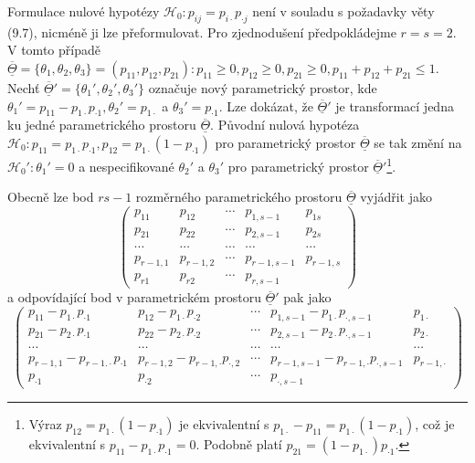 Formulace nulové hypotézy $\mathscr{H}_0: p_{ij} = p_{i \cdot}p_{\cdot j}$ není v souladu s požadavky věty (9.7), nicméně ji lze přeformulovat. Pro zjednodušení předpokládejme $r = s = 2$. V tomto případě $\overline{\underline{\Theta}} = \{\theta_1, \theta_2, \theta_3\} = (p_{11}, p_{12}, p_{21}): p_{11} \ge 0, p_{12} \ge 0, p_{21} \ge 0, p_{11} + p_{12} + p_{21} \le 1$. Nechť $\overline{\underline{\Theta}}' = \{\theta_1', \theta_2', \theta_3'\}$ označuje nový parametrický prostor, kde $\theta_1' = p_{11} - p_{1 \cdot}p_{\cdot 1}, \theta_2' = p_{1 \cdot}$ a $\theta_3' = p_{\cdot 1}$. Lze dokázat, že $\overline{\underline{\Theta}}'$ je transformací jedna ku jedné parametrického prostoru  $\overline{\underline{\Theta}}$. Původní nulová hypotéza $\mathscr{H}_0: p_{11} = p_{1 \cdot}p_{\cdot 1}, p_{12} = p_{1 \cdot}(1 - p_{\cdot 1})$ pro parametrický prostor $\overline{\underline{\Theta}}$ se tak změní na $\mathscr{H}_0': \theta_1' = 0$ a nespecifikované $\theta_2'$ a $\theta_3'$ pro parametrický prostor $\overline{\underline{\Theta}}'$\footnote{Výraz $p_{12} = p_{1 \cdot}(1 - p_{\cdot 1})$ je ekvivalentní s $p_{1 \cdot} - p_{11} = p_{1 \cdot}(1 - p_{\cdot 1})$, což je ekvivalentní s $p_{11} - p_{1 \cdot}p_{\cdot 1} = 0$. Podobně platí $p_{21} = (1 - p_{1 \cdot})p_{\cdot 1}$.}.

Obecně lze bod $rs - 1$ rozměrného parametrického prostoru $\overline{\underline{\Theta}}$ vyjádřit jako
\begin{equation*}
\begin{pmatrix}
p_{11} & p_{12} & \cdots & p_{1, s - 1} & p_{1s}\\
p_{21} & p_{22} & \cdots & p_{2, s - 1} & p_{2s}\\
\cdots & \cdots & \cdots & \cdots & \cdots\\
p_{r - 1, 1} & p_{r - 1, 2} & \cdots & p_{r - 1, s - 1} & p_{r - 1, s}\\
p_{r1} & p_{r2} & \cdots & p_{r, s - 1} &
\end{pmatrix}
\end{equation*}
a odpovídající bod v parametrickém prostoru $\overline{\underline{\Theta}}'$ pak jako
\begin{equation*}
\begin{pmatrix}
p_{11} - p_{1 \cdot}p_{\cdot 1} & p_{12} - p_{1 \cdot}p_{\cdot 2} & \cdots & p_{1, s - 1} - p_{1 \cdot}p_{\cdot, s - 1} & p_{1 \cdot}\\
p_{21} - p_{2 \cdot}p_{\cdot 1} & p_{22} - p_{2 \cdot}p_{\cdot 2} & \cdots & p_{2, s - 1} - p_{2 \cdot}p_{\cdot, s - 1} & p_{2 \cdot}\\
\cdots & \cdots & \cdots & \cdots & \cdots\\
p_{r - 1, 1} - p_{r - 1. \cdot}p_{\cdot 1} & p_{r - 1, 2} - p_{r - 1, \cdot}p_{\cdot, 2} & \cdots & p_{r - 1, s - 1} - p_{r - 1, \cdot}p_{\cdot, s - 1} & p_{r - 1, \cdot}\\
p_{\cdot 1} & p_{\cdot 2} & \cdots & p_{\cdot, s - 1} &
\end{pmatrix}
\end{equation*}

